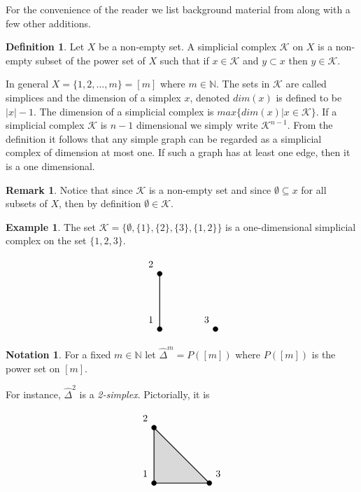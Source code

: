 \documentclass[oneside,12pt]{amsart}
\theoremstyle{definition}
\newtheorem{Definition}[Theorem]{Definition}
\newtheorem{Notation}[Theorem]{Notation}
\newtheorem{Remark}[Theorem]{Remark}
\newtheorem{Example}[Theorem]{Example}
\numberwithin{equation}{section}
\begin{document}
For the convenience of the reader we list background material from \cite{ALDH} along with a few other additions.
\begin{Definition}
Let $X$ be a non-empty set. A simplicial complex $\mathcal{K}$ on $X$ is a non-empty subset of the power set of $X$ such that if $x\in \mathcal{K}$ and $y\subset x$ then $y\in \mathcal{K}$.
\end{Definition}

In general $X=\{1,2,\ldots,m\}=[m]$ where $m\in \mathbb{N}$. The sets in $\mathcal{K}$ are called simplices and the dimension of a simplex $x$, denoted $dim(x)$ is defined to be $|x|-1$. The dimension of a simplicial complex is $max\{dim(x)|x\in \mathcal{K}\}$.  If a simplicial complex $\mathcal{K}$ is $n-1$ dimensional we simply write $\mathcal{K}^{n-1}$.  From the definition it follows that any simple graph can be regarded as a simplicial complex of dimension at most one.  If such a graph has at least one edge, then it is a one dimensional.

\begin{Remark}
Notice that since $\mathcal{K}$ is a non-empty set and since $\emptyset \subseteq x$ for all subsets of $X$, then by definition $\emptyset\in \mathcal{K}$.
\end{Remark}

\begin{Example}\label{E1}
The set $\mathcal{K}=\{\emptyset,\{1\},\{2\},\{3\},\{1,2\}\}$ is a one-dimensional simplicial complex on the set $\{1,2,3\}$.\\
\begin{minipage}{\linewidth}
$$\begin{tikzpicture}
\filldraw [black] (-10,0) node[above left =3pt]{$1$} circle (2.5pt);  %
\filldraw [black] (-10,2) node[above left =3pt]{$2$} circle (2.5pt);  %
\draw[thick] (-10,0) -- (-10,2);
\filldraw [black] (-8,0) node[above left =3pt]{$3$} circle (2.5pt);
\end{tikzpicture}$$
        \end{minipage}
\end{Example}

\begin{Notation}
For a fixed $m\in \mathbb{N}$ let $\widehat{\Delta}^m=P([m])$ where $P([m])$ is the power set on $[m]$.
\end{Notation}
 For instance, $\widehat{\Delta}^2$ is a \textit{2-simplex}.  Pictorially, it is

\begin{minipage}{\linewidth}
$$\begin{tikzpicture}
\filldraw[thick,gray!30]  (-10,0) -- (-10,2)--(-8,0)--(-10,0);
\draw[thick]  (-10,0) -- (-10,2)--(-8,0)--(-10,0);
\filldraw [black] (-10,0) node[above left =3pt]{$1$} circle (2.5pt);  %
\filldraw [black] (-10,2) node[above left =3pt]{$2$} circle (2.5pt);  %
\filldraw [black] (-8,0) node[above right =3pt]{$3$} circle (2.5pt);
\end{tikzpicture}$$
        \end{minipage}\\
\end{document}
